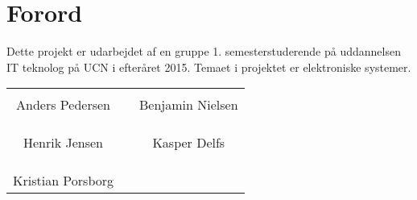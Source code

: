 \chapter*{Forord}

Dette projekt er udarbejdet af en gruppe 1. semesterstuderende på uddannelsen
IT teknolog på UCN i efteråret 2015. Temaet i projektet er elektroniske systemer.





%
\phantom{Luft}\vspace{3cm}
\begin{table}[H]
	\centering
		\begin{tabular}{c c c}
			\underline{\phantom{JAERJAERJAERJAERGO}} & \phantom{cookies} & \underline{\phantom{JAERJAERJAERJAERGO}} \\
			Anders Pedersen			& \phantom{cookies} & Benjamin Nielsen		\\
			&&\\
			&&\\
			\underline{\phantom{JAERJAERJAERJAERGO}} & \phantom{cookies} & \underline{\phantom{JAERJAERJAERJAERGO}} \\
			Henrik Jensen			& \phantom{cookies} & Kasper Delfs		\\
			&&\\
			&&\\
	    \underline{\phantom{JAERJAERJAERJAERGO}} & \phantom{cookies} & \\
			Kristian Porsborg  					 
			&&\\							
		\end{tabular}
\end{table}